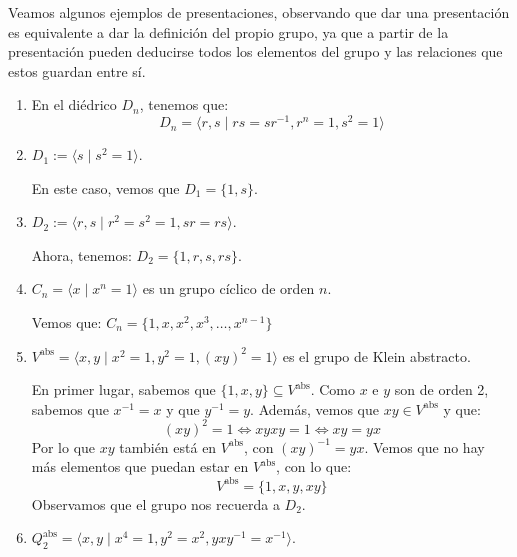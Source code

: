 \begin{ejemplo}
    Veamos algunos ejemplos de presentaciones, observando que dar una presentación es equivalente a dar la definición del propio grupo, ya que a partir de la presentación pueden deducirse todos los elementos del grupo y las relaciones que estos guardan entre sí.
    \begin{enumerate}
        \item En el diédrico $D_n$, tenemos que:
        \begin{equation*}
            D_n = \langle r,s \mid rs=sr^{-1}, r^n = 1, s^2 = 1 \rangle 
        \end{equation*}
        \item $D_1 := \langle s\mid s^2 = 1 \rangle$.

            En este caso, vemos que $D_1 = \{1,s\}$.
        \item $D_2 := \langle r,s\mid r^2 = s^2 = 1, sr=rs \rangle$.

            Ahora, tenemos: $D_2 = \{1, r, s, rs\}$.
        \item $C_n = \langle x \mid x^n = 1 \rangle $ es un grupo cíclico de orden $n$.
            
            Vemos que: $C_n = \{1, x, x^2, x^3, \ldots, x^{n-1}\}$
        \item $V^{\text{abs}} = \langle x,y \mid x^2=1,y^2 = 1, {(xy)}^{2}=1 \rangle $ es el grupo de Klein abstracto.

            En primer lugar, sabemos que $\{1,x,y\}\subseteq V^{\text{abs}}$. Como $x$ e $y$ son de orden 2, sabemos que $x^{-1} = x$ y que $y^{-1} = y$. Además, vemos que $xy\in V^{\text{abs}}$ y que:
            \begin{equation*}
                {(xy)}^{2} = 1 \Longleftrightarrow xyxy = 1 \Longleftrightarrow xy = yx
            \end{equation*}
            Por lo que $xy$ también está en $V^{\text{abs}}$, con ${(xy)}^{-1} = yx$. Vemos que no hay más elementos que puedan estar en $V^{\text{abs}}$, con lo que:
            \begin{equation*}
                V^{\text{abs}} = \{1,x,y,xy\}
            \end{equation*}
            Observamos que el grupo nos recuerda a $D_2$.
        \item $Q_2^{\text{abs}} = \langle x,y\mid x^4 = 1, y^2 = x^2, yxy^{-1} = x^{-1} \rangle $.


\end{enumerate}
\end{ejemplo}
